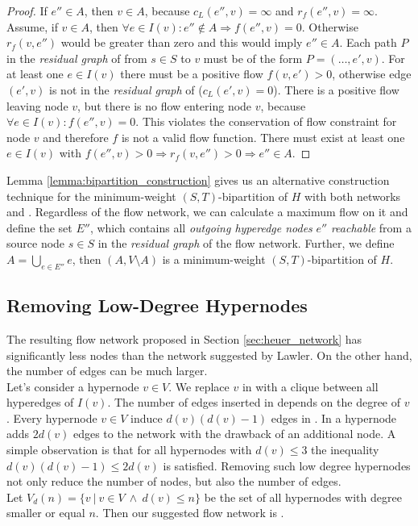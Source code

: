 \begin{proof}
If $e'' \in A$, then $v \in A$, because $c_L(e'',v) = \infty$ and $r_f(e'',v) = \infty$.
Assume, if $v \in A$, then $\forall e \in I(v): e'' \notin A \Rightarrow f(e'',v) = 0$. 
Otherwise $r_f(v, e'')$ would be greater than zero and this would imply $e'' \in A$. Each path 
$P$ in the \emph{residual graph} of  from $s \in S$ to $v$ must be of the 
form $P = (\ldots,e',v)$. For at least one $e \in I(v)$ there must be a positive flow $f(v,e') > 0$,
otherwise edge $(e',v)$ is not in the \emph{residual graph} of  ($c_L(e',v) = 0$).
There is a positive flow leaving node $v$, but there is no flow entering node $v$, because
$\forall e \in I(v): f(e'',v) = 0$. This violates the conservation of flow
constraint for node $v$ and therefore $f$ is not a valid flow function. There must exist at least one $e \in I(v)$
with $f(e'',v) > 0 \Rightarrow r_f(v,e'') > 0 \Rightarrow e'' \in A$.
\end{proof}

Lemma \ref{lemma:bipartition_construction} gives us an alternative construction technique for the minimum-weight $(S,T)$-bipartition
of $H$ with both networks  and . Regardless of the flow network, we can 
calculate a maximum flow on it and define the set $E''$, which contains all \emph{outgoing hyperedge
nodes} $e''$ \emph{reachable} from a source node $s \in S$ in the \emph{residual graph} of the flow network. 
Further, we define $A = \bigcup_{e \in E''} e$, then $(A,V\setminus A)$ is a 
minimum-weight $(S,T)$-bipartition of $H$.


\subsection{Removing Low-Degree Hypernodes}
\label{sec:degree_network}

The resulting flow network  proposed in Section \ref{sec:heuer_network} has significantly
less nodes than the network  suggested by Lawler. On the other hand, the number of
edges can be much larger. \\
Let's consider a hypernode $v \in V$. We replace $v$ in  with a clique between all
hyperedges of $I(v)$. The number of edges inserted in  depends on the degree of
$v$. Every hypernode $v \in V$ induce $d(v)(d(v) - 1)$ edges in . In  a hypernode adds $2d(v)$ edges to the network with the drawback
of an additional node. A simple observation is that for all hypernodes with $d(v) \le 3$ the inequality
$d(v)(d(v) - 1) \le 2d(v)$ is satisfied. Removing such low degree hypernodes not only reduce
the number of nodes, but also the number of edges. \\
Let $V_{d}(n) = \{v\ |\ v \in V\ \land\ d(v) \le n\}$ be the set of all hypernodes
with degree smaller or equal $n$. Then our suggested flow network is .

